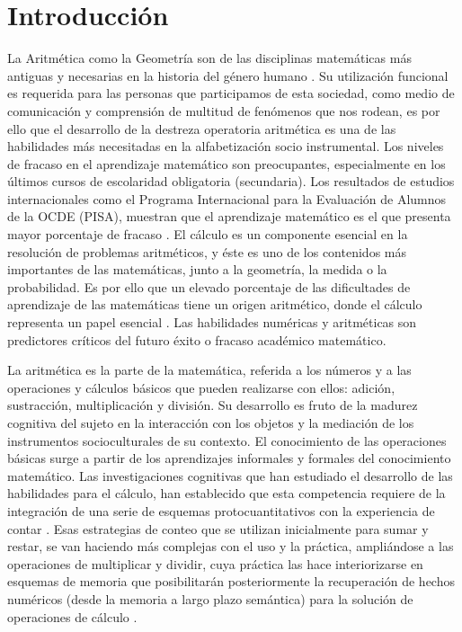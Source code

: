 \documentclass{article}
\begin{document}
\section{Introducción}
La Aritmética como la Geometría son de las disciplinas matemáticas más antiguas y 
necesarias en la historia del género humano \cite{coronado2014estudio}. Su utilización 
funcional es requerida para las personas que participamos de esta sociedad, como 
medio de comunicación y comprensión de multitud de fenómenos que nos rodean, es por 
ello que el desarrollo de la destreza operatoria aritmética es una de las habilidades 
más necesitadas en la alfabetización socio instrumental. Los niveles de fracaso en el 
aprendizaje matemático son preocupantes, especialmente en los últimos cursos de 
escolaridad obligatoria (secundaria).  Los resultados de estudios internacionales 
como el Programa Internacional para la Evaluación de Alumnos de la OCDE 
(PISA)\cite{oecd2014what,oecd2016low}, muestran que el aprendizaje matemático es el 
que presenta mayor porcentaje de fracaso  \cite{coronado2016academic, mullis2016timss}. 
El cálculo es un componente esencial en la resolución de problemas aritméticos, 
y éste es uno de los contenidos más importantes de las matemáticas, junto a la geometría, 
la medida o la probabilidad. Es por ello que un elevado porcentaje de las dificultades de 
aprendizaje de las matemáticas tiene un origen aritmético, donde el cálculo representa un 
papel esencial \cite{orrantia2006dificultades}.  Las habilidades numéricas y aritméticas 
son predictores críticos del futuro éxito o fracaso académico 
matemático\cite{rodriguez2017marcadores}.  


La aritmética es la parte de la matemática, referida a los números y a las operaciones 
y cálculos básicos que pueden realizarse con ellos: adición, sustracción, multiplicación 
y división. Su desarrollo es fruto de la madurez cognitiva del sujeto en la interacción 
con los objetos y la mediación de los instrumentos socioculturales de su contexto.  
El conocimiento de las operaciones básicas surge a partir de los aprendizajes informales 
y formales del conocimiento matemático. Las investigaciones cognitivas que han estudiado el 
desarrollo de las habilidades para el cálculo, han establecido que esta competencia requiere 
de la integración de una serie de esquemas protocuantitativos \cite{resnick1989developing,resnick1987learning}
con la experiencia de contar \cite{fuson1992research}.  Esas estrategias de conteo que 
se utilizan inicialmente para sumar y restar, se van haciendo más complejas con el uso 
y la práctica, ampliándose a las operaciones de multiplicar y dividir, cuya práctica las 
hace interiorizarse en esquemas de memoria que posibilitarán posteriormente la recuperación 
de hechos numéricos (desde la memoria a  largo plazo semántica) para la solución de operaciones 
de cálculo \cite{fuson1992research,godino2009sentido,fuson1988children}.
\end{document}

